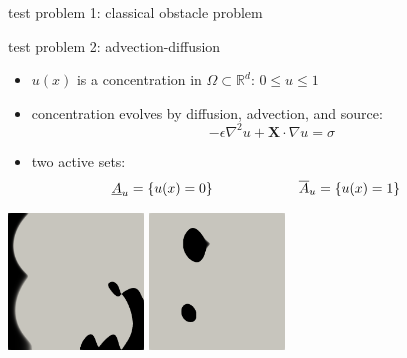 \documentclass[svgnames,
               hyperref={colorlinks,citecolor=DeepPink4,linkcolor=FireBrick,urlcolor=Maroon},
               usepdftitle=false]  %
               {beamer}
\newcommand{\eps}{\epsilon}
\newcommand{\RR}{\mathbb{R}}
\newcommand{\grad}{\nabla}
\begin{document}
\begin{frame}{test problem 1: classical obstacle problem}
%

\end{frame}


\begin{frame}{test problem 2: advection-diffusion}

\begin{itemize}
\item $u(x)$ is a concentration in $\Omega \subset \RR^d$: \qquad $\boxed{0\le u\le 1}$
\item concentration evolves by diffusion, advection, and source:
    $$-\eps \grad^2 u + \bm{X}\cdot \grad u = \sigma$$
\item two active sets:
    $$\underline{A}_u = \{u(x) = 0\} \hspace{22mm} \overline{A}_u = \{u(x) = 1\} \hspace{8mm}$$
\end{itemize}

\centering
\includegraphics[width=0.27\textwidth]{../paper/fixfigs/poll2d-zero-set.png} \hspace{18mm}
\includegraphics[width=0.27\textwidth]{../paper/fixfigs/poll2d-one-set.png}
\end{frame}
\end{document}
